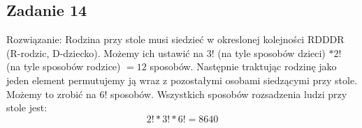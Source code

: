 \subsection{Zadanie 14}

Rozwiązanie:
Rodzina przy stole musi siedzieć w okreslonej kolejności RDDDR (R-rodzic, D-dziecko).
Możemy ich ustawić na $3!$ (na tyle sposobów dzieci) $* 2!$ (na tyle sposobów rodzice)  $= 12$ sposobów. 
Następnie traktując rodzinę jako jeden element permutujemy ją wraz z pozostałymi osobami siedzącymi przy
stole. Możemy to zrobić na $6!$ sposobów. Wszystkich sposobów rozsadzenia ludzi przy stole jest:
$$
2! * 3! * 6! = 8 640
$$

